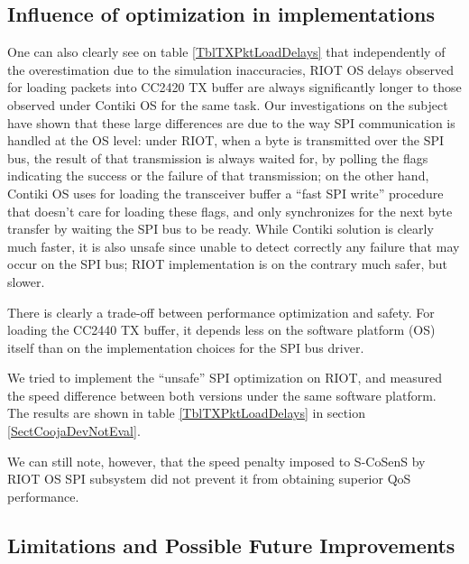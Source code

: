 \documentclass[12pt,a4paper]{article}
\begin{document}

\subsection{Influence of optimization in implementations}

One can also clearly see on table \ref{TblTXPktLoadDelays} that independently
of the overestimation due to the simulation inaccuracies, RIOT OS delays
observed for loading packets into CC2420 TX buffer are always significantly
longer to those observed under Contiki OS for the same task.
Our investigations on the subject have shown that these large differences
are due to the way SPI communication is handled at the OS level: under RIOT,
when a byte is transmitted over the SPI bus, the result of that transmission
is always waited for, by polling the flags indicating the success or the
failure of that transmission; on the other hand, Contiki OS uses for loading
the transceiver buffer a ``fast SPI write'' procedure that doesn't care for
loading these flags, and only synchronizes for the next byte transfer by
waiting the SPI bus to be ready. While Contiki solution is clearly much
faster, it is also unsafe since unable to detect correctly any failure
that may occur on the SPI bus; RIOT implementation is on the contrary
much safer, but slower.

\begin{observ}
There is clearly a trade-off between performance optimization and safety.
For loading the CC2440 TX buffer, it depends less on the software platform
(OS) itself than on the implementation choices for the SPI bus driver.
\end{observ}

We tried to implement the ``unsafe'' SPI optimization on RIOT, and measured
the speed difference between both versions under the same software platform.
The results are shown in table \ref{TblTXPktLoadDelays} in section
\ref{SectCoojaDevNotEval}.

We can still note, however, that the speed penalty imposed to S-CoSenS by
RIOT OS SPI subsystem did not prevent it from obtaining superior QoS
performance.


\subsection{Limitations and Possible Future Improvements}
\label{SectLimits}
\end{document}
